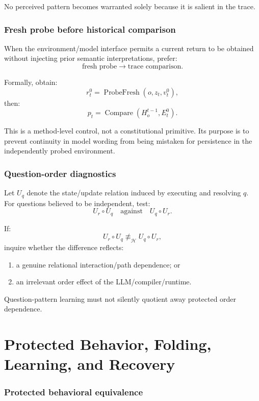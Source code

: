 \documentclass[11pt,oneside]{article}
\begin{document}
No perceived pattern becomes warranted solely because it is salient in the trace.

\section{Fresh probe before historical comparison}

When the environment/model interface permits a current return to be obtained without injecting prior semantic interpretations, prefer:
\[
\boxed{
\text{fresh probe}
\longrightarrow
\text{trace comparison}.
}
\]

Formally, obtain:
\[
r_t^0=\operatorname{ProbeFresh}(o,z_t,v_t^0),
\]
then:
\[
p_t=
\operatorname{Compare}(H_o^{t-1},E_t^0).
\]

This is a method-level control, not a constitutional primitive.  Its purpose is to prevent continuity in model wording from being mistaken for persistence in the independently probed environment.

\section{Question-order diagnostics}

Let \(U_q\) denote the state/update relation induced by executing and resolving \(q\).  For questions believed to be independent, test:
\[
U_r\circ U_q
\quad\text{against}\quad
U_q\circ U_r.
\]

If:
\[
\boxed{
U_r\circ U_q
\not\equiv_{\mathcal H}
U_q\circ U_r,
}
\]
inquire whether the difference reflects:
\begin{enumerate}
\item a genuine relational interaction/path dependence; or
\item an irrelevant order effect of the LLM/compiler/runtime.
\end{enumerate}

Question-pattern learning must not silently quotient away protected order dependence.


\part{Protected Behavior, Folding, Learning, and Recovery}

\section{Protected behavioral equivalence}
\end{document}
